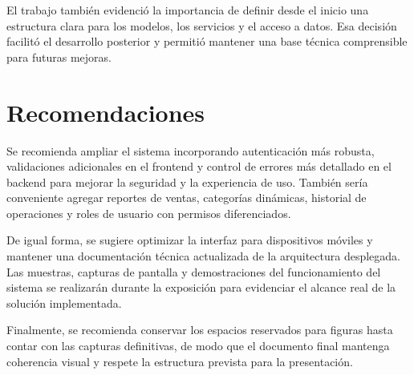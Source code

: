 El trabajo tambi\'en evidenci\'o la importancia de definir desde el inicio una estructura clara para los modelos, los servicios y el acceso a datos. Esa decisi\'on facilit\'o el desarrollo posterior y permiti\'o mantener una base t\'ecnica comprensible para futuras mejoras.

\section{Recomendaciones}

Se recomienda ampliar el sistema incorporando autenticaci\'on m\'as robusta, validaciones adicionales en el frontend y control de errores m\'as detallado en el backend para mejorar la seguridad y la experiencia de uso. Tambi\'en ser\'ia conveniente agregar reportes de ventas, categor\'ias din\'amicas, historial de operaciones y roles de usuario con permisos diferenciados.

De igual forma, se sugiere optimizar la interfaz para dispositivos m\'oviles y mantener una documentaci\'on t\'ecnica actualizada de la arquitectura desplegada. Las muestras, capturas de pantalla y demostraciones del funcionamiento del sistema se realizar\'an durante la exposici\'on para evidenciar el alcance real de la soluci\'on implementada.

Finalmente, se recomienda conservar los espacios reservados para figuras hasta contar con las capturas definitivas, de modo que el documento final mantenga coherencia visual y respete la estructura prevista para la presentaci\'on.
